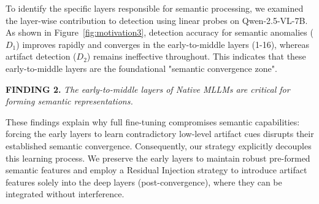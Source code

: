 \documentclass{article}
\theoremstyle{plain}
\theoremstyle{definition}
\theoremstyle{remark}
\begin{document}
To identify the specific layers responsible for semantic processing, we examined the layer-wise contribution to detection using linear probes on Qwen-2.5-VL-7B.
As shown in Figure~\ref{fig:motivation3}, detection accuracy for semantic anomalies ($D_1$) improves rapidly and converges in the early-to-middle layers (1-16), whereas artifact detection ($D_2$) remains ineffective throughout.
This indicates that these early-to-middle layers are the foundational "semantic convergence zone".
\begin{simplebox} 
  \footnotesize \textbf{FINDING 2.} \textit{The early-to-middle layers of Native MLLMs are critical for forming semantic representations.} 
\end{simplebox}
These findings explain why full fine-tuning compromises semantic capabilities: forcing the early layers to learn contradictory low-level artifact cues disrupts their established semantic convergence. Consequently, our strategy explicitly decouples this learning process. 
We preserve the early layers to maintain robust pre-formed semantic features and employ a Residual Injection strategy to introduce artifact features solely into the deep layers (post-convergence), where they can be integrated without interference.
\end{document}
